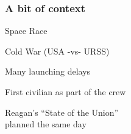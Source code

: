 \documentclass[12pt]{beamer}\usepackage[]{graphicx}\usepackage[]{color}
\begin{document}

\begin{frame}
\begin{center}
\Huge{}
\end{center}
\end{frame}


{ %
    \begin{frame}[plain]
     \end{frame}
}


\begin{frame}
\frametitle{A bit of context}

\bi
  \item Space Race
  \item Cold War (USA -vs- URSS)
  \item Many launching delays
  \item First civilian as part of the crew
  \item Reagan's ``State of the Union'' \\
  {\lolit planned the same day}
\ei
\eb

\end{frame}
\end{document}
